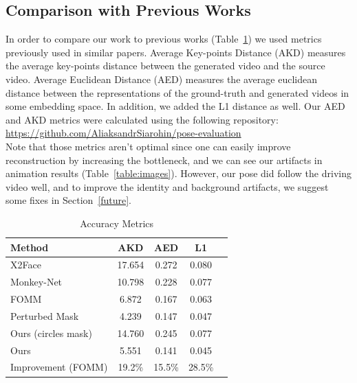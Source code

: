 \documentclass{article}
\begin{document}
\subsection{Comparison with Previous Works}
In order to compare our work to previous works (Table~\ref{table:results})
we used metrics previously used in similar papers.
Average Key-points Distance \cite{cao2017realtime} (AKD)
measures the average key-points distance between the generated video and
the source video. Average Euclidean Distance \cite{zheng2019joint} (AED)
measures the average euclidean distance
 between the representations of the ground-truth and generated videos in
 some embedding space. In addition, we added the L1 distance as well.
 Our AED and AKD metrics were calculated using the following repository:
 \url{https://github.com/AliaksandrSiarohin/pose-evaluation}
\\
Note that those metrics aren't optimal since one can easily improve
reconstruction by increasing the bottleneck, and we can see our
artifacts in animation results (Table~\ref{table:images}).
However, our pose did follow the driving video well, and to improve the
identity and background artifacts, we suggest some fixes in Section~\ref{future}.


\begin{table}[t]
\caption{Accuracy Metrics}
\label{table:results}
\vskip 0.15in
\begin{center}
\begin{small}
\begin{sc}
\begin{tabular}{lcccr}
\toprule
Method & AKD & AED & L1 \\
\midrule
X2Face    & 17.654 & 0.272 & 0.080 \\
Monkey-Net    & 10.798 & 0.228 & 0.077 \\
FOMM    & 6.872 & 0.167 & 0.063 \\
Perturbed Mask & 4.239 & 0.147 & 0.047 \\
Ours (circles mask) & 14.760& 0.245 & 0.077 \\
Ours & 5.551 & 0.141 &  0.045\\
\midrule
Improvement (FOMM)    & 19.2\% & 15.5\% & 28.5\% \\
\bottomrule
\end{tabular}
\end{sc}
\end{small}
\end{center}
\vskip -0.1in
\end{table}
\end{document}
